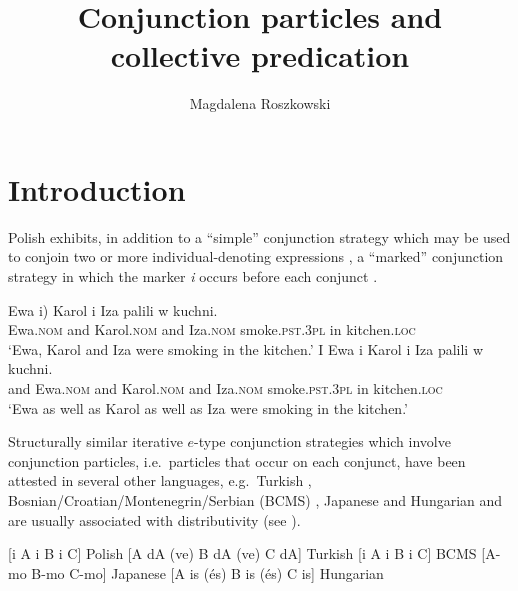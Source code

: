 \documentclass[output=paper]{langscibook}
\author{Magdalena Roszkowski\affiliation{Central European University}}
\title{Conjunction particles and collective predication}
\begin{document}
\maketitle

\section{Introduction}\label{ros:sec:1}


Polish exhibits, in addition to a ``simple'' conjunction strategy which may be used to conjoin two or more individual-denoting expressions , a ``marked'' conjunction strategy in which the marker \textit{i} occurs before each conjunct .

\ea\label{ros:ex1} \gll Ewa \minsp{(} i) Karol i Iza palili w kuchni. \\
Ewa.\textsc{nom} {} and Karol.\textsc{nom} and Iza.\textsc{nom} smoke.\textsc{pst.3pl} in kitchen.\textsc{loc} \\
\glt `Ewa, Karol and Iza were smoking in the kitchen.'
\ex\label{ros:ex2} \gll I Ewa i Karol i Iza palili w kuchni. \\
and Ewa.\textsc{nom} and Karol.\textsc{nom} and Iza.\textsc{nom} smoke.\textsc{pst.3pl} in kitchen.\textsc{loc} \\
\glt `Ewa as well as Karol as well as Iza were smoking in the kitchen.'
\z 

\noindent Structurally similar iterative $e$-type conjunction strategies which involve conjunction particles, i.e.~particles that occur on each conjunct, have been attested in several other languages, e.g.~Turkish , Bosnian/Croatian/Montenegrin\slash Ser\-bi\-an (BCMS) , Japanese  and Hungarian  and are usually associated with distributivity (see \citealt{Flor:2017Cross, Mitrovic:2014,Szabolcsi:2015}).

\ea \label{ros:cross}
\ea \label{ros:pl} [i A i B i C]  \hfill Polish
\ex \label{ros:tr} [A dA (ve) B dA (ve) C dA] \hfill Turkish
\ex \label{ros:ser} [i A i B i C] \hfill BCMS
\ex \label{ros:jap} [A-mo B-mo C-mo] \hfill Japanese
\ex \label{ros:hu} [A is (és) B  is (és) C is] \hfill Hungarian
\z\z

\end{document}
